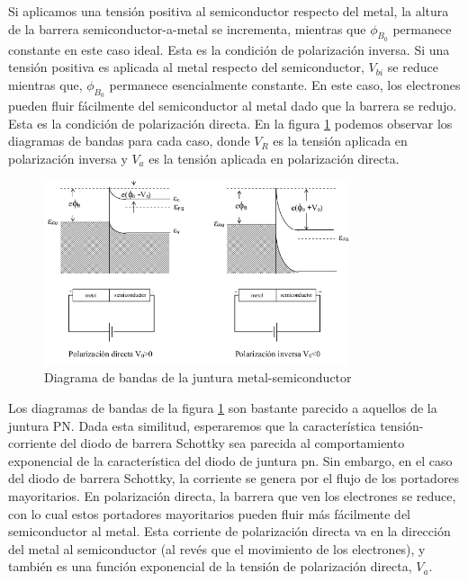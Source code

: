 \documentclass[oneside]{book}
\numberwithin{equation}{section}
\numberwithin{figure}{section}
\numberwithin{table}{section}
\begin{document}
			Si aplicamos una tensión positiva al semiconductor respecto del metal, la altura de la barrera semiconductor-a-metal se incrementa, mientras que $\phi_{B_0}$ permanece constante en este caso ideal. Esta es la condición de polarización inversa. Si una tensión positiva es aplicada al metal respecto del semiconductor, $V_{bi}$ se reduce mientras que, $\phi _{B_0}$ permanece esencialmente constante. En este caso, los electrones pueden fluir fácilmente del semiconductor al metal dado que la barrera se redujo. Esta es la condición de polarización directa. En la figura \ref{Diagrama de bandas de la juntura metal-semiconductor} podemos observar los diagramas de bandas para cada caso, donde $V_R$ es la tensión aplicada en polarización inversa y $V_a$ es la tensión aplicada en polarización directa.

			\begin{figure}[H]
				\begin{center}
					\includegraphics[width=0.8\textwidth]{metalsemiconductorpolarizacion.png}
					\caption{Diagrama de bandas de la juntura metal-semiconductor}
					\label{Diagrama de bandas de la juntura metal-semiconductor}
				\end{center}
			\end{figure}

			Los diagramas de bandas de la figura \ref{Diagrama de bandas de la juntura metal-semiconductor} son bastante parecido a aquellos de la juntura PN. Dada esta similitud, esperaremos que la característica tensión-corriente del diodo de barrera Schottky sea parecida al comportamiento exponencial de la característica del diodo de juntura pn. Sin embargo, en el caso del diodo de barrera Schottky, la corriente se genera por el flujo de los portadores mayoritarios. En polarización directa, la barrera que ven los electrones se reduce, con lo cual estos portadores mayoritarios pueden fluir más fácilmente del semiconductor al metal. Esta corriente de polarización directa va en la dirección del metal al semiconductor (al revés que el movimiento de los electrones), y también es una función exponencial de la tensión de polarización directa, $V_a$.
\end{document}

